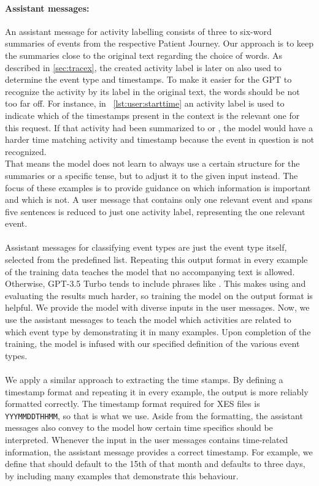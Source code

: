 \paragraph{Assistant messages:} An assistant message for activity labelling consists of three to six-word summaries of events from the respective Patient Journey. Our approach is to keep the summaries close to the original text regarding the choice of words. As described in \autoref{sec:tracex}, the created activity label is later on also used to determine the event type and timestamps. To make it easier for the GPT to recognize the activity by its label in the original text, the words should be not too far off. For instance, in ~\autoref{lst:user:starttime} an activity label is used to indicate which of the timestamps present in the context is the relevant one for this request. If that activity had been summarized to  or , the model would have a harder time matching activity and timestamp because the event in question is not recognized.\\
That means the model does not learn to always use a certain structure for the summaries or a specific tense, but to adjust it to the given input instead. The focus of these examples is to provide guidance on which information is important and which is not. A user message that contains only one relevant event and spans five sentences is reduced to just one activity label, representing the one relevant event.\\\\
Assistant messages for classifying event types are just the event type itself, selected from the predefined list. Repeating this output format in every example of the training data teaches the model that no accompanying text is allowed. Otherwise, GPT-3.5 Turbo tends to include phrases like . This makes using and evaluating the results much harder, so training the model on the output format is helpful. We provide the model with diverse inputs in the user messages. Now, we use the assistant messages to teach the model which activities are related to which event type by demonstrating it in many examples. Upon completion of the training, the model is infused with our specified definition of the various event types. \\\\
We apply a similar approach to extracting the time stamps. By defining a timestamp format and repeating it in every example, the output is more reliably formatted correctly. The timestamp format required for XES files is \verb|YYYMMDDTHHMM|, so that is what we use. Aside from the formatting, the assistant messages also convey to the model how certain time specifics should be interpreted. Whenever the input in the user messages contains time-related information, the assistant message provides a correct timestamp. For example, we define that  should default to the 15th of that month and  defaults to three days, by including many examples that demonstrate this behaviour. \\
